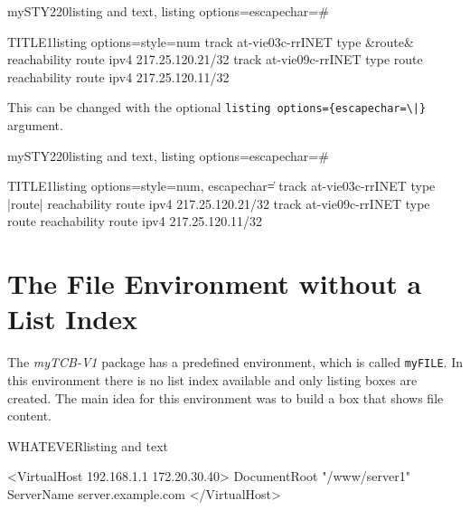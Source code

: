 \documentclass[]{myHOWTO-V001}
\begin{document}
\begin{myTEXEXdoclst}{mySTY220}{listing and text, listing options={escapechar=\#}}
\begin{myCONFIGEXlst}{TITLE1}{listing options={style=num}}
track at-vie03c-rrINET type &{\color{red}route}& reachability route ipv4 217.25.120.21/32
track at-vie09c-rrINET type route reachability route ipv4 217.25.120.11/32
\end{myCONFIGEXlst}
\end{myTEXEXdoclst}

This can be changed with the optional \verb#listing options={escapechar=\|}# argument.

\begin{myTEXEXdoclst}{mySTY220}{listing and text, listing options={escapechar=\#}}
\begin{myCONFIGEXlst}{TITLE1}{listing options={style=num, escapechar=\|}}
track at-vie03c-rrINET type |{\color{red}route}| reachability route ipv4 217.25.120.21/32
track at-vie09c-rrINET type route reachability route ipv4 217.25.120.11/32
\end{myCONFIGEXlst}
\end{myTEXEXdoclst}

%
%

\section{The File Environment without a List Index}

The \emph{myTCB-V1} package has a predefined environment, which is called \Verb|myFILE|. In this environment there is no list index available and only listing boxes are created. The main idea for this environment was to build a box that shows file content.

\begin{myTEXEXdoclst}{WHATEVER}{listing and text}
\begin{myFILE}{}
<VirtualHost 192.168.1.1 172.20.30.40>
	DocumentRoot "/www/server1"
	ServerName server.example.com
</VirtualHost>
\end{myFILE}
\end{myTEXEXdoclst}
\end{document}
